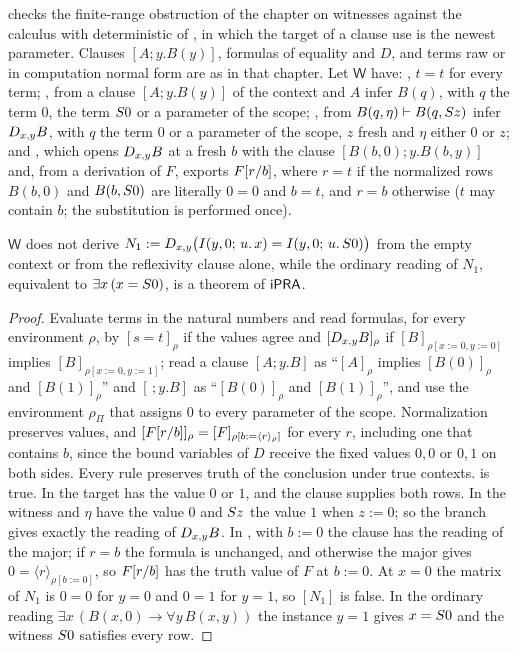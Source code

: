  checks the finite-range obstruction of the chapter on
witnesses against the calculus with deterministic  of
, in which the target of a clause use is the newest
parameter. Clauses $[A;y.B(y)]$, formulas of equality and $D$, and terms raw
or in computation normal form are as in that chapter. Let $\mathsf W$ have:
, $t=t$ for every term; , from a clause
$[A;y.B(y)]$ of the context and $A$ infer $B(q)$, with $q$ the term $0$, the
term $S 0$ or a parameter of the scope; , from
$B(q,\eta)\vdash B(q,S z)$ infer $D_{x,y}B$, with $q$ the term $0$ or a
parameter of the scope, $z$ fresh and $\eta$ either $0$ or $z$; and
, which opens $D_{x,y}B$ at a fresh $b$ with the clause
$[B(b,0);y.B(b,y)]$ and, from a derivation of $F$, exports $F[r/b]$,
where $r=t$ if the normalized rows $B(b,0)$ and $B(b,S 0)$ are literally
$0=0$ and $b=t$, and $r=b$ otherwise ($t$ may contain $b$; the substitution is
performed once).

\begin{proposition}\label{cert:prop:joint-restriction}
$\mathsf W$ does not derive
$N_1\mathrel{:=}D_{x,y}\bigl(I(y,0;\,u.\,x)=I(y,0;\,u.\,S 0)\bigr)$ from the
empty context or from the reflexivity clause alone, while the ordinary reading
of $N_1$, equivalent to $\exists x\,(x=S 0)$, is a theorem of $\mathsf{iPRA}$.
\end{proposition}
\begin{proof}
Evaluate terms in the natural numbers and read formulas, for every
environment $\rho$, by $[s=t]_\rho$ if the values agree and
$[D_{x,y}B]_\rho$ if $[B]_{\rho[x:=0,y:=0]}$ implies $[B]_{\rho[x:=0,y:=1]}$;
read a clause $[A;y.B]$ as ``$[A]_\rho$ implies $[B(0)]_\rho$ and
$[B(1)]_\rho$'' and $[\,;y.B]$ as ``$[B(0)]_\rho$ and $[B(1)]_\rho$'', and use
the environment $\rho_\Pi$ that assigns $0$ to every parameter of the scope.
Normalization preserves values, and $[F[r/b]]_\rho=
[F]_{\rho[b:=\langle r\rangle_\rho]}$ for every $r$, including one that contains
$b$, since the bound variables of $D$ receive the fixed values $0,0$ or $0,1$
on both sides. Every rule preserves truth of the conclusion under true
contexts.  is true. In  the target has the value
$0$ or $1$, and the clause supplies both rows. In  the witness
and $\eta$ have the value $0$ and $S z$ the value $1$ when $z:=0$; so the
branch gives exactly the reading of $D_{x,y}B$. In , with
$b:=0$ the clause has the reading of the major; if $r=b$ the formula is
unchanged, and otherwise the major gives $0=\langle r\rangle_{\rho[b:=0]}$, so
$F[r/b]$ has the truth value of $F$ at $b:=0$. At $x=0$ the matrix of
$N_1$ is $0=0$ for $y=0$ and $0=1$ for $y=1$, so $[N_1]$ is false. In the
ordinary reading $\exists x\,(B(x,0)\to\forall y\,B(x,y))$ the instance $y=1$
gives $x=S 0$ and the witness $S 0$ satisfies every row.
\end{proof}

